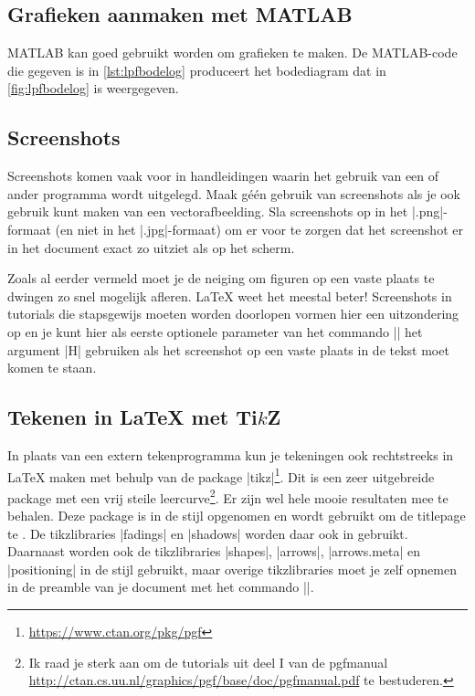 \subsection{Grafieken aanmaken met MATLAB}
MATLAB kan goed gebruikt worden om grafieken te maken.
De MATLAB-code  die gegeven is in \cref{lst:lpfbodelog} produceert het bodediagram dat in \cref{fig:lpfbodelog} is weergegeven.



\subsection{Screenshots}
Screenshots komen vaak voor in handleidingen waarin het gebruik van een of ander programma wordt uitgelegd.
Maak géén gebruik van screenshots als je ook gebruik kunt maken van een vectorafbeelding.
Sla screenshots op in het |.png|-formaat (en niet in het |.jpg|-formaat) om er voor te zorgen dat het screenshot er in het document exact zo uitziet als op het scherm.

Zoals al eerder vermeld moet je de neiging om figuren op een vaste plaats te dwingen zo snel mogelijk afleren.
\LaTeX{} weet het meestal beter!
Screenshots in tutorials die stapsgewijs moeten worden doorlopen vormen hier een uitzondering op en je kunt hier als eerste optionele parameter van het commando |\figuur|
het argument |H| gebruiken als het screenshot op een vaste plaats in de tekst moet komen te staan.

\subsection{Tekenen in \LaTeX{} met \texorpdfstring{Ti\boldmath$k$Z}{TikZ}}
In plaats van een extern tekenprogramma kun je tekeningen ook rechtstreeks in \LaTeX{} maken met behulp van de package |tikz|\footnote{\url{https://www.ctan.org/pkg/pgf}}.
Dit is een zeer uitgebreide package met een vrij steile leercurve\footnote{%
	Ik raad je sterk aan om de tutorials uit deel I van de pgfmanual \url{http://ctan.cs.uu.nl/graphics/pgf/base/doc/pgfmanual.pdf} te bestuderen.
}.
Er zijn wel hele mooie resultaten mee te behalen.
Deze package is in de stijl opgenomen en wordt gebruikt om de titlepage te .
De tikzlibraries |fadings| en |shadows| worden daar ook in gebruikt. 
Daarnaast worden ook de tikzlibraries |shapes|, |arrows|, |arrows.meta| en |positioning| in de stijl gebruikt, maar overige tikzlibraries moet je zelf opnemen in de preamble van je document met het commando |\usetikzlibrary|.

